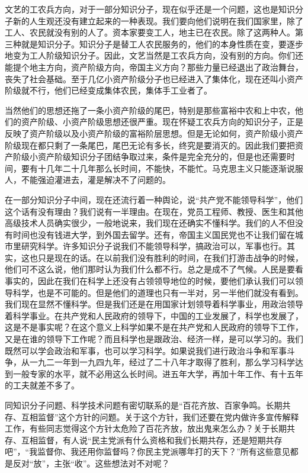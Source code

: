 文艺的工农兵方向，对于一部分知识分子，现在似乎还是一个问题，这也是知识分子新的人生观还没有建立起来的一种表现。我们要向他们说明在我们国家里，除了工人、农民就没有别的人了。资本家要变工人，地主已在农民。除了这两种人。第三种就是知识分子。知识分子是替工人农民服务的，他们的本身性质在变，要逐步地变为工人阶级知识分子。因此，文艺当然是工农兵方向，没有别的方向。你们还能提个地主方向，资产阶级方向，帝国主义方向？那些力量已经退出了政治舞台，丧失了社会基础。至于几亿小资产阶级分子也已经进入了集体化，现在还叫小资产阶级就不行，他们已经变成集体农民，集体手工业者了。

当然他们的思想还拖了一条小资产阶级的尾巴，特别是那些富裕中农和上中农，他们的资产阶级、小资产阶级思想还很严重。现在怀疑工农兵方向的知识分子，正是反映了资产阶级以及小资产阶级的富裕阶层思想。但是无论如何，资产阶级小资产阶级现在都只剩了一条尾巴，尾巴无论有多长，终究是要消灭的。因此我们要把资产阶级小资产阶级知识分子团结争取过来，条件是完全充分的，但是也还需要时间，要有十几年二十几年那么长时间，不能快，不能忙。马克思主义只能逐渐说服人，不能强迫灌进去，灌是解决不了问题的。

在一部分知识分子中间，现在还流行着一种舆论，说“共产党不能领导科学”，他们这个话有没有理由？我们说有一半理由。在现在，党员工程师、教授、医生和其他高级技术人员确实很少，一般地说来，我们现在还确实不懂科学。我们的人不但没有时间也没有钱进大学，到外国去留学。还有，帝国主义国民党也不让我们留在城市里研究科学。许多知识分子说我们不能领导科学，搞政治可以，军事也行。其实，这也只是现在的话。在以前我们没有胜利的时间，在我们打游击战争的时候，他们可不这么说，他们那时认为我们什么都不行。总之是成不了气候。人民是要看事实的，因此在我们在科学上还没有占领领导地位的时候，要他们承认我们可以领导科学，也是不可能的。但是他们的道理也只有一半对，另一半他们就没有看到。我们现在显然不懂科学。但是我们还是在用国家计划领导着科学事业，用政治领导着科学事业。在共产党和人民政府的领导下，中国的工业发展了，科学也发展了，这是不是事实呢？在这个意义上科学如果不是在共产党和人民政府的领导下工作，又是在谁的领导下工作呢？而且科学也是跟政治、经济一样，是可以学习的。我们既然可以学会政治和军事，也可以学习科学。如果说我们进行政治斗争和军事斗争，从一九二一年到一九四九年，经过了二十八年才取得了胜利，那么学习科学达到一般专家的水平，就不必用这么长时间。进五年大学，再加十年工作、有十五年的工夫就差不多了。

同知识分子问题、科学技术问题有密切联系的是“百花齐放、百家争鸣。长期共存、互相监督”这个方针的问题。关于这个方针，我们还要在党内做许多宣传解释工作，有些同志觉得这个方针太危险了百花齐放，放出鬼来怎么办？关于长期共存、互相监督，有人说“民主党派有什么资格和我们长期共存，还是短期共存吧”，“我监督你、我还用你监督吗？你民主党派哪年打的天下？”所有这些意见都是反对“放”，主张“收”。这些想法对不对呢？

